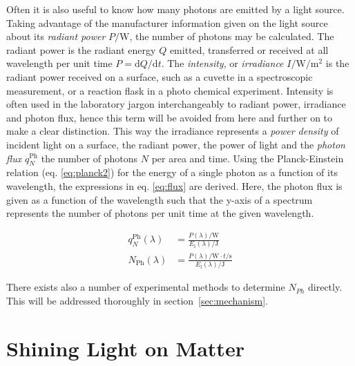	Often it is also useful to know how many photons are emitted by a light source. Taking advantage of the manufacturer information given on the light source about its \emph{radiant power} $P/\unit{\W}$, the number of photons may be calculated. The radiant power is the radiant energy $Q$ emitted, transferred or received at all wavelength per unit time $P = \mathrm{d}Q/\mathrm{d}t$. The \emph{intensity}, or \emph{irradiance} $I/\unit{\W\per\square\m}$ is the radiant power received on a surface, such as a cuvette in a spectroscopic measurement, or a reaction flask in a photo chemical experiment. Intensity is often used in the laboratory jargon interchangeably to radiant power, irradiance and photon flux, hence this term will be avoided from here and further on to make a clear distinction. This way the irradiance represents a \emph{power density} of incident light on a surface, the radiant power, the power of light and the \emph{photon flux} $q^\mathrm{Ph}_N$ the number of photons $N$ per area and time. Using the Planck-Einstein relation (eq. \ref{eq:planck2}) for the energy of a single photon as a function of its wavelength, the expressions in eq. \ref{eq:flux} are derived. Here, the photon flux is given as a function of the wavelength such that the y-axis of a spectrum represents the number of photons per unit time at the given wavelength.

	\begin{equation}
		\label{eq:flux}
	\begin{split}
		q^\mathrm{Ph}_N(\lambda) &= \frac{P(\lambda)/\unit{\W}}{E_\mathrm{l}(\lambda)/\unit{\J}} \\
		N_\mathrm{Ph}(\lambda) &= \frac{P(\lambda)/\unit{\W}\cdot t/\unit{\s}}{E_\mathrm{l}(\lambda)/\unit{\J}}
	\end{split}
	\end{equation} 

	There exists also a number of experimental methods to determine $N_{Ph}$ directly. This will be addressed thoroughly in section~\ref{sec:mechanism}.



	\section{Shining Light on Matter}

